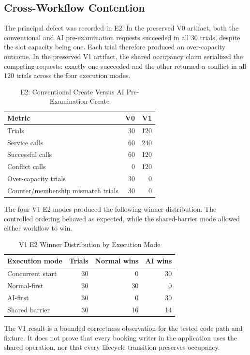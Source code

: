 \documentclass[conference]{IEEEtran}
\begin{document}
\subsection{Cross-Workflow Contention}
The principal defect was recorded in E2. In the preserved V0 artifact, both the conventional and AI pre-examination requests succeeded in all 30 trials, despite the slot capacity being one. Each trial therefore produced an over-capacity outcome. In the preserved V1 artifact, the shared occupancy claim serialized the competing requests: exactly one succeeded and the other returned a conflict in all 120 trials across the four execution modes.

\begin{table}[!t]
\caption{E2: Conventional Create Versus AI Pre-Examination Create}
\label{tab:e2}
\centering
\footnotesize
\begin{tabular}{lrr}
\toprule
Metric & V0 & V1 \\
\midrule
Trials & 30 & 120 \\
Service calls & 60 & 240 \\
Successful calls & 60 & 120 \\
Conflict calls & 0 & 120 \\
Over-capacity trials & 30 & 0 \\
Counter/membership mismatch trials & 30 & 0 \\
\bottomrule
\end{tabular}
\end{table}

The four V1 E2 modes produced the following winner distribution. The controlled ordering behaved as expected, while the shared-barrier mode allowed either workflow to win.

\begin{table}[!t]
\caption{V1 E2 Winner Distribution by Execution Mode}
\label{tab:e2modes}
\centering
\footnotesize
\begin{tabular}{lrrr}
\toprule
Execution mode & Trials & Normal wins & AI wins \\
\midrule
Concurrent start & 30 & 0 & 30 \\
Normal-first & 30 & 30 & 0 \\
AI-first & 30 & 0 & 30 \\
Shared barrier & 30 & 16 & 14 \\
\bottomrule
\end{tabular}
\end{table}

The V1 result is a bounded correctness observation for the tested code path and fixture. It does not prove that every booking writer in the application uses the shared operation, nor that every lifecycle transition preserves occupancy.
\end{document}
